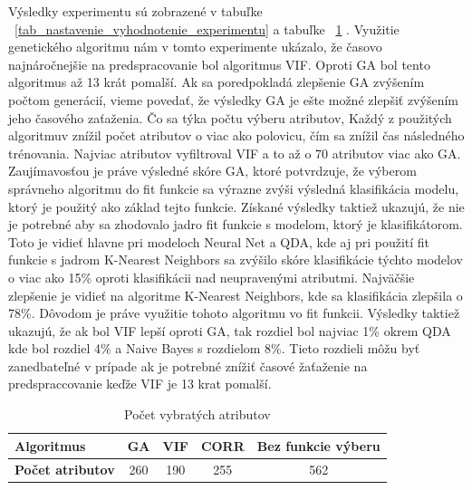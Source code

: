\documentclass[runningheads]{llncs}
\begin{document}
Výsledky experimentu sú zobrazené v tabuľke ~\ref{tab_nastavenie_vyhodnotenie_experimentu} 
a tabuľke ~\ref{tab_pocet_vyber_atributov} . Využitie genetického algoritmu
nám v tomto experimente ukázalo, že časovo najnáročnejšie na predspracovanie bol algoritmus 
VIF. Oproti GA bol tento algoritmus až 13 krát pomalší. Ak sa poredpokladá 
zlepšenie GA zvýšením počtom generácií, vieme povedať, že výsledky GA je ešte možné zlepšiť 
zvýšením jeho časového zaťaženia. Čo sa týka počtu výberu atributov, Každý z 
použitých algoritmuv znížil počet atributov o viac ako polovicu, čím sa znížil čas následného 
trénovania. Najviac atributov vyfiltroval VIF a to až o 70 atributov viac ako GA. 
Zaujímavosťou je práve výsledné skóre GA, ktoré potvrdzuje, že výberom správneho algoritmu 
do fit funkcie sa výrazne zvýši výsledná klasifikácia modelu, ktorý je použitý
ako základ tejto funkcie. Získané výsledky taktiež ukazujú, že nie je potrebné aby sa 
zhodovalo jadro fit funkcie s modelom, ktorý je klasifikátorom. Toto je vidieť 
hlavne pri modeloch Neural Net a QDA, kde aj pri použití fit funkcie s jadrom 
K-Nearest Neighbors sa zvýšilo skóre klasifikácie týchto modelov o viac ako 15\% oproti 
klasifikácii nad neupravenými atributmi. Najväčšie zlepšenie je vidieť na algoritme 
K-Nearest Neighbors, kde sa klasifikácia zlepšila o 78\%. Dôvodom je práve využitie tohoto algoritmu vo fit funkcii.
Výsledky taktiež ukazujú, že ak bol VIF lepší oproti GA, tak rozdiel bol najviac 1\% okrem QDA 
kde bol rozdiel 4\% a Naive Bayes s rozdielom 8\%. Tieto rozdieli môžu byť zanedbateľné v prípade ak
je potrebné znížiť časové žaťaženie na predspraccovanie keďže VIF je 13 krat pomalší.

\begin{table}[]
    \centering
    \caption{Počet vybratých atributov}\label{tab_pocet_vyber_atributov}
    \begin{tabular}{|l|c|c|c|c|}
    \hline
    \textbf{Algoritmus}                  & GA        & VIF         & CORR          & Bez funkcie výberu \\ \hline
    \textbf{Počet atributov}            & 260        & 190         & 255          & 562 \\ \hline
    \end{tabular}
\end{table}
\end{document}
